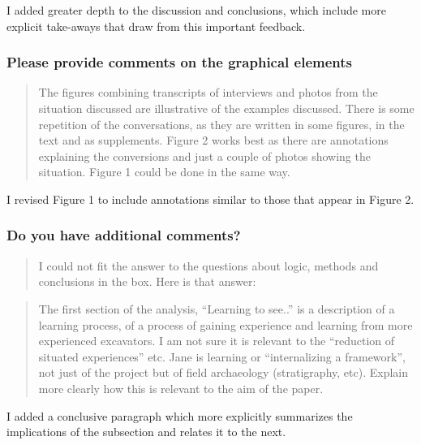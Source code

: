 \documentclass[
]{article}
\begin{document}
I added greater depth to the discussion and conclusions, which include
more explicit take-aways that draw from this important feedback.

\subsubsection{Please provide comments on the graphical
elements}\label{please-provide-comments-on-the-graphical-elements}

\begin{quote}
The figures combining transcripts of interviews and photos from the
situation discussed are illustrative of the examples discussed. There is
some repetition of the conversations, as they are written in some
figures, in the text and as supplements. Figure 2 works best as there
are annotations explaining the conversions and just a couple of photos
showing the situation. Figure 1 could be done in the same way.
\end{quote}

I revised Figure 1 to include annotations similar to those that appear
in Figure 2.

\subsubsection{Do you have additional
comments?}\label{do-you-have-additional-comments}

\begin{quote}
I could not fit the answer to the questions about logic, methods and
conclusions in the box. Here is that answer:
\end{quote}

\begin{quote}
The first section of the analysis, ``Learning to see..'' is a
description of a learning process, of a process of gaining experience
and learning from more experienced excavators. I am not sure it is
relevant to the ``reduction of situated experiences'' etc. Jane is
learning or ``internalizing a framework'', not just of the project but
of field archaeology (stratigraphy, etc). Explain more clearly how this
is relevant to the aim of the paper.
\end{quote}

I added a conclusive paragraph which more explicitly summarizes the
implications of the subsection and relates it to the next.
\end{document}
